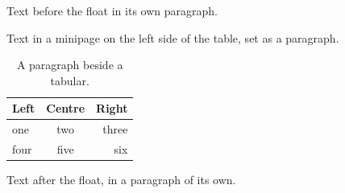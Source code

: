 \documentclass[12pt]{article}
\begin{document}
Text before the float in its own paragraph.

\begin{table}[h]
\begin{minipage}[t]{0.4\linewidth}
Text in a minipage on the left side of the table, set as a paragraph.
\end{minipage}\hfill
\begin{minipage}[t]{0.5\linewidth}
\centering
\begin{tabular}{lcr}\hline Left & Centre & Right\\\hline one & two & three\\ four & five & six\\\hline\end{tabular}
\end{minipage}
\caption{A paragraph beside a tabular.}
\end{table}

Text after the float, in a paragraph of its own.
\end{document}

